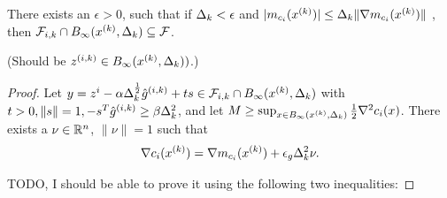 \begin{theorem}
There exists an $\epsilon > 0$, such that if $\Delta_k < \epsilon$ and \color{red}$|m_{c_i}({x^{(k)}})| \le \Delta_k\|\nabla m_{c_i}({x^{(k)}})\|$ \color{black},
then ${\mathcal F_{i, k}} \cap B_{\infty}({x^{(k)}}, \Delta_k) \subseteq {\mathcal F}$.

(Should be $z^{(i, k)} \in B_{\infty}({x^{(k)}}, \Delta_k))$.)
\end{theorem}

\begin{proof}
Let $y = z^i - \alpha \Delta_k^{\frac 1 2}{{\hat g}^{(i, k)}} + t s \in {\mathcal F_{i, k}} \cap B_{\infty}({x^{(k)}}, \Delta_k) $ with $t > 0, \|s\| = 1, -s^T{{\hat g}^{(i, k)}} \ge \beta \Delta_k^2$, and let $M \ge \sup_{x \in B_{\infty}({x^{(k)}}, \Delta_k)} \frac 1 2 \nabla^2 c_i(x)$.
There exists a $\nu \in {\mathbb R^{n}}$, $\|\nu\|=1$ such that 
\begin{align*}
\nabla c_i({x^{(k)}}) = \nabla m_{c_i}({x^{(k)}}) + \epsilon_{g}\Delta_k^2\nu.
\end{align*}

\color{red}
TODO, I should be able to prove it using the following two inequalities:
\color{black}





\end{proof}
